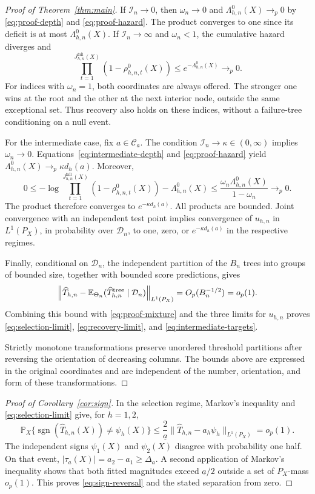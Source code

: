 \documentclass[12pt]{article}
\newcommand{\E}{\mathbb E}
\newcommand{\Prb}{\mathbb P}
\begin{document}
\begin{appendix}
\begin{proof}[Proof of Theorem~\ref{thm:main}]
If \(\mathcal I_n\to0\), then \(\omega_n\to0\) and \(\Lambda_{h,n}^0(X)\to_p0\) by \eqref{eq:proof-depth} and \eqref{eq:proof-hazard}. The product converges to one since its deficit is at most \(\Lambda_{h,n}^0(X)\). If \(\mathcal I_n\to\infty\) and \(\omega_n<1\), the cumulative hazard diverges and
\[
\prod_{t=1}^{J_{h,n}^{\mathrm{fail}}(X)}(1-\rho_{h,n,t}^0(X))
\le e^{-\Lambda_{h,n}^0(X)}\longrightarrow_p0.
\]
For indices with \(\omega_n=1\), both coordinates are always offered. The stronger one wins at the root and the other at the next interior node, outside the same exceptional set. Thus recovery also holds on these indices, without a failure-tree conditioning on a null event.

For the intermediate case, fix \(a\in\mathcal C_a\). The condition \(\mathcal I_n\to\kappa\in(0,\infty)\) implies \(\omega_n\to0\). Equations~\eqref{eq:intermediate-depth} and \eqref{eq:proof-hazard} yield \(\Lambda_{h,n}^0(X)\to_p\kappa d_h(a)\). Moreover,
\[
0\le-\log\prod_{t=1}^{J_{h,n}^{\mathrm{fail}}(X)}(1-\rho_{h,n,t}^0(X))
-\Lambda_{h,n}^0(X)
\le\frac{\omega_n\Lambda_{h,n}^0(X)}{1-\omega_n}
\longrightarrow_p0.
\]
The product therefore converges to \(e^{-\kappa d_h(a)}\). All products are bounded. Joint convergence with an independent test point implies convergence of \(u_{h,n}\) in \(L^1(P_X)\), in probability over \(\mathcal D_n\), to one, zero, or \(e^{-\kappa d_h(a)}\) in the respective regimes.

Finally, conditional on \(\mathcal D_n\), the independent partition of the \(B_n\) trees into groups of bounded size, together with bounded score predictions, gives
\[
\left\|\widehat T_{h,n}-
\E_{\Theta_n}(\widehat T^{\rm tree}_{h,n}\mid\mathcal D_n)\right\|_{L^1(P_X)}
=O_p(B_n^{-1/2})=o_p(1).
\]
Combining this bound with \eqref{eq:proof-mixture} and the three limits for \(u_{h,n}\) proves \eqref{eq:selection-limit}, \eqref{eq:recovery-limit}, and \eqref{eq:intermediate-targets}.

Strictly monotone transformations preserve unordered threshold partitions after reversing the orientation of decreasing columns. The bounds above are expressed in the original coordinates and are independent of the number, orientation, and form of these transformations.
\end{proof}

\begin{proof}[Proof of Corollary~\ref{cor:sign}]
In the selection regime, Markov's inequality and \eqref{eq:selection-limit} give, for \(h=1,2\),
\[
\Prb_X\{\operatorname{sgn}(\widehat T_{h,n}(X))\ne\psi_h(X)\}
\le\frac{2}{\underline a}
\|\widehat T_{h,n}-a_h\psi_h\|_{L^1(P_X)}=o_p(1).
\]
The independent signs \(\psi_1(X)\) and \(\psi_2(X)\) disagree with probability one half. On that event, \(|\tau_a(X)|=a_2-a_1\ge\Delta_a\). A second application of Markov's inequality shows that both fitted magnitudes exceed \(\underline a/2\) outside a set of \(P_X\)-mass \(o_p(1)\). This proves \eqref{eq:sign-reversal} and the stated separation from zero.


\end{proof}
\end{appendix}
\end{document}
